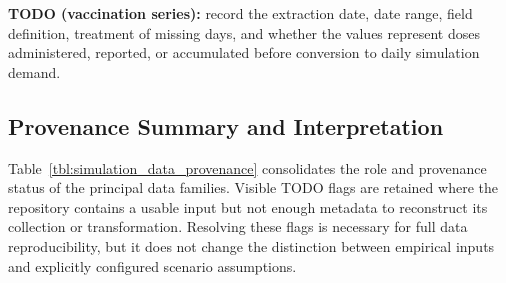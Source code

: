 {\color{red}\textbf{TODO (vaccination series):} record the extraction date, date range, field definition, treatment of missing days, and whether the values represent doses administered, reported, or accumulated before conversion to daily simulation demand.}

\subsection{Provenance Summary and Interpretation}
\label{sec:input_provenance_summary}

Table~\ref{tbl:simulation_data_provenance} consolidates the role and provenance status of the principal data families. Visible TODO flags are retained where the repository contains a usable input but not enough metadata to reconstruct its collection or transformation. Resolving these flags is necessary for full data reproducibility, but it does not change the distinction between empirical inputs and explicitly configured scenario assumptions.

